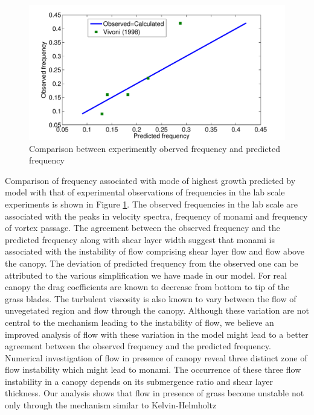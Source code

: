 \documentclass[aps,prl,twocolumn,showpacs,superscriptaddress,groupedaddress,10pt]{revtex4-1}  %
\begin{document}
\begin{figure}[htb]
\includegraphics[scale=0.34]{Observed_vs_calculated}
\caption{Comparison between experimently oberved frequency and predicted frequency}
\label{Observed_calculated}
\end{figure}
\newline
Comparison of frequency associated with mode of highest growth predicted by model with that of experimental observations of frequencies in the lab scale experiments is shown in
Figure \ref{Observed_calculated}.
The observed frequencies in the lab scale are associated with the peaks in velocity spectra, frequency of monami and frequency of vortex passage. The agreement between the observed
frequency and the predicted frequency along with shear layer width suggest that monami is associated with the instability of flow comprising shear layer flow and flow above the canopy.
The deviation of predicted frequency from the observed one can be attributed to the various simplification we have made in our model. For real canopy the drag coefficients are known to
decrease from bottom to tip of the grass blades. The turbulent viscosity is also known to vary between the flow of unvegetated region and flow through the canopy. Although these variation
are not central to the mechanism leading to the instability of flow, we believe an improved analysis of flow with these variation in the model might lead to a better agreement between the
observed frequency and the predicted frequency.   
\newline
Numerical investigation of flow in presence of canopy reveal three distinct zone of flow instability which might lead to monami. The occurrence of these three flow instability in a canopy
depends on its submergence ratio and shear layer thickness. Our analysis shows that flow in presence of grass become unstable not only through the mechanism similar to Kelvin-Helmholtz
\end{document}
